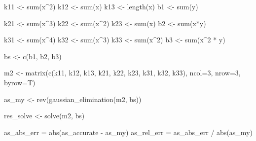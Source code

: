\documentclass[
  letterpaper,
  DIV=11,
  numbers=noendperiod]{scrartcl}
\newenvironment{Shaded}{\begin{snugshade}}{\end{snugshade}}
\newcommand{\AttributeTok}[1]{\textcolor[rgb]{0.40,0.45,0.13}{#1}}
\newcommand{\DecValTok}[1]{\textcolor[rgb]{0.68,0.00,0.00}{#1}}
\newcommand{\FunctionTok}[1]{\textcolor[rgb]{0.28,0.35,0.67}{#1}}
\newcommand{\NormalTok}[1]{\textcolor[rgb]{0.00,0.23,0.31}{#1}}
\newcommand{\OtherTok}[1]{\textcolor[rgb]{0.00,0.23,0.31}{#1}}
\newcommand{\SpecialCharTok}[1]{\textcolor[rgb]{0.37,0.37,0.37}{#1}}
\begin{document}
\begin{Shaded}
\begin{Highlighting}[]
\NormalTok{k11 }\OtherTok{\textless{}{-}} \FunctionTok{sum}\NormalTok{(x}\SpecialCharTok{\^{}}\DecValTok{2}\NormalTok{)}
\NormalTok{k12 }\OtherTok{\textless{}{-}} \FunctionTok{sum}\NormalTok{(x)}
\NormalTok{k13 }\OtherTok{\textless{}{-}} \FunctionTok{length}\NormalTok{(x)}
\NormalTok{b1  }\OtherTok{\textless{}{-}} \FunctionTok{sum}\NormalTok{(y)}

\NormalTok{k21 }\OtherTok{\textless{}{-}} \FunctionTok{sum}\NormalTok{(x}\SpecialCharTok{\^{}}\DecValTok{3}\NormalTok{)}
\NormalTok{k22 }\OtherTok{\textless{}{-}} \FunctionTok{sum}\NormalTok{(x}\SpecialCharTok{\^{}}\DecValTok{2}\NormalTok{)}
\NormalTok{k23 }\OtherTok{\textless{}{-}} \FunctionTok{sum}\NormalTok{(x)}
\NormalTok{b2  }\OtherTok{\textless{}{-}} \FunctionTok{sum}\NormalTok{(x}\SpecialCharTok{*}\NormalTok{y)}

\NormalTok{k31 }\OtherTok{\textless{}{-}} \FunctionTok{sum}\NormalTok{(x}\SpecialCharTok{\^{}}\DecValTok{4}\NormalTok{)}
\NormalTok{k32 }\OtherTok{\textless{}{-}} \FunctionTok{sum}\NormalTok{(x}\SpecialCharTok{\^{}}\DecValTok{3}\NormalTok{)}
\NormalTok{k33 }\OtherTok{\textless{}{-}} \FunctionTok{sum}\NormalTok{(x}\SpecialCharTok{\^{}}\DecValTok{2}\NormalTok{)}
\NormalTok{b3  }\OtherTok{\textless{}{-}} \FunctionTok{sum}\NormalTok{(x}\SpecialCharTok{\^{}}\DecValTok{2} \SpecialCharTok{*}\NormalTok{ y)}

\NormalTok{bs    }\OtherTok{\textless{}{-}} \FunctionTok{c}\NormalTok{(b1, b2, b3)}

\NormalTok{m2    }\OtherTok{\textless{}{-}} \FunctionTok{matrix}\NormalTok{(}\FunctionTok{c}\NormalTok{(k11, k12, k13,}
\NormalTok{                  k21, k22, k23,}
\NormalTok{                  k31, k32, k33), }\AttributeTok{ncol=}\DecValTok{3}\NormalTok{, }\AttributeTok{nrow=}\DecValTok{3}\NormalTok{, }\AttributeTok{byrow=}\NormalTok{T)}

\NormalTok{as\_my }\OtherTok{\textless{}{-}} \FunctionTok{rev}\NormalTok{(}\FunctionTok{gaussian\_elimination}\NormalTok{(m2, bs))}

\NormalTok{res\_solve }\OtherTok{\textless{}{-}} \FunctionTok{solve}\NormalTok{(m2, bs)}

\NormalTok{as\_abs\_err }\OtherTok{=} \FunctionTok{abs}\NormalTok{(as\_accurate }\SpecialCharTok{{-}}\NormalTok{ as\_my)}
\NormalTok{as\_rel\_err }\OtherTok{=}\NormalTok{ as\_abs\_err }\SpecialCharTok{/} \FunctionTok{abs}\NormalTok{(as\_my)}
\end{Highlighting}
\end{Shaded}
\end{document}
